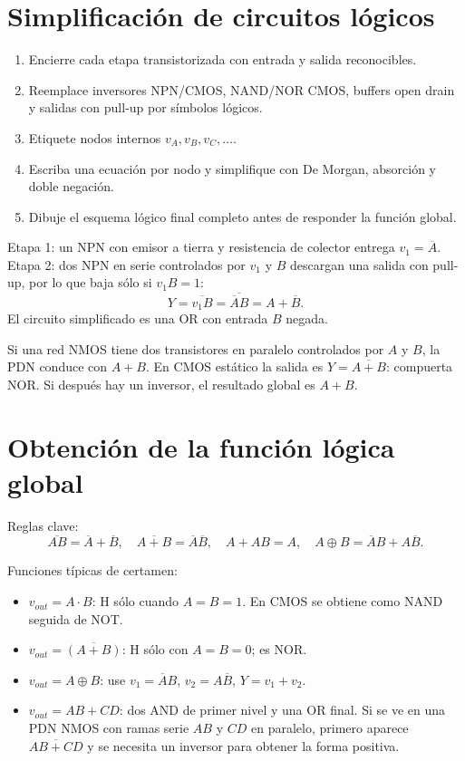 \documentclass[11pt,letterpaper]{article}
\newcommand{\NOT}[1]{\overline{#1}}\newcommand{\VDD}{V_{DD}}\newcommand{\VCC}{V_{CC}}\newcommand{\VOH}{V_{OH}}\newcommand{\VOL}{V_{OL}}\newcommand{\VIH}{V_{IH}}\newcommand{\VIL}{V_{IL}}
\begin{document}
\section{Simplificación de circuitos lógicos}
\begin{procedimiento}\begin{enumerate}
\item Encierre cada etapa transistorizada con entrada y salida reconocibles.
\item Reemplace inversores NPN/CMOS, NAND/NOR CMOS, buffers open drain y salidas con pull-up por símbolos lógicos.
\item Etiquete nodos internos $v_A,v_B,v_C,\ldots$.
\item Escriba una ecuación por nodo y simplifique con De Morgan, absorción y doble negación.
\item Dibuje el esquema lógico final completo antes de responder la función global.
\end{enumerate}\end{procedimiento}
\begin{ejemplo}
Etapa 1: un NPN con emisor a tierra y resistencia de colector entrega $v_1=\NOT{A}$. Etapa 2: dos NPN en serie controlados por $v_1$ y $B$ descargan una salida con pull-up, por lo que baja sólo si $v_1B=1$:
\[Y=\NOT{v_1B}=\NOT{\NOT{A}B}=A+\NOT{B}.\]
El circuito simplificado es una OR con entrada $B$ negada.
\end{ejemplo}
\begin{ejemplo}
Si una red NMOS tiene dos transistores en paralelo controlados por $A$ y $B$, la PDN conduce con $A+B$. En CMOS estático la salida es $Y=\NOT{A+B}$: compuerta NOR. Si después hay un inversor, el resultado global es $A+B$.
\end{ejemplo}

\section{Obtención de la función lógica global}
Reglas clave:
\[\NOT{AB}=\NOT{A}+\NOT{B},\quad \NOT{A+B}=\NOT{A}\NOT{B},\quad A+AB=A,\quad A\oplus B=\NOT{A}B+A\NOT{B}.\]
\begin{ejemplo}
Funciones típicas de certamen:
\begin{itemize}
\item $v_{out}=A\cdot B$: H sólo cuando $A=B=1$. En CMOS se obtiene como NAND seguida de NOT.
\item $v_{out}=\NOT{(A+B)}$: H sólo con $A=B=0$; es NOR.
\item $v_{out}=A\oplus B$: use $v_1=\NOT{A}B$, $v_2=A\NOT{B}$, $Y=v_1+v_2$.
\item $v_{out}=AB+CD$: dos AND de primer nivel y una OR final. Si se ve en una PDN NMOS con ramas serie $AB$ y $CD$ en paralelo, primero aparece $\NOT{AB+CD}$ y se necesita un inversor para obtener la forma positiva.
\end{itemize}\end{ejemplo}
\end{document}
